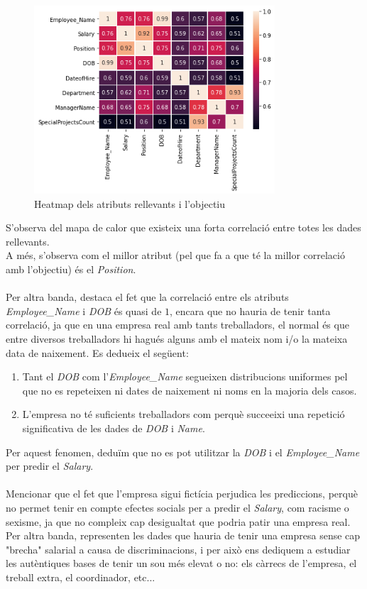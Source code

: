 \documentclass[a4paper, 11pt]{article}
\begin{document}
\begin{figure}
    \centering
    \includegraphics[width=0.8\textwidth]{CORRELACIONS/correlacions.png}
    \caption{Heatmap dels atributs rellevants i l'objectiu}
    \label{fig:my_label}
\end{figure}
\hspace{-1.8 em}
S'observa del mapa de calor que existeix una forta correlació entre totes les dades rellevants.\\
A més, s'observa com el millor atribut (pel que fa a que té la millor correlació amb l'objectiu) és el \textit{Position}.\\\\
Per altra banda, destaca el fet que la correlació entre els atributs \textit{Employee\_Name} i \textit{DOB} és quasi de $1$, encara que no hauria de tenir tanta correlació, ja que en una empresa real amb tants treballadors, el normal és que entre diversos treballadors hi hagués alguns amb el mateix nom i/o la mateixa data de naixement. Es dedueix el següent:
\begin{enumerate}
    \item Tant el \textit{DOB} com l'\textit{Employee\_Name} segueixen distribucions uniformes pel que no es repeteixen ni dates de naixement ni noms en la majoria dels casos.
    \item L'empresa no té suficients treballadors com perquè succeeixi una repetició significativa de les dades de \textit{DOB} i \textit{Name}.
\end{enumerate}
Per aquest fenomen, deduïm que no es pot utilitzar la \textit{DOB} i el \textit{Employee\_Name} per predir el \textit{Salary}.\\\\
Mencionar que el fet que l'empresa sigui fictícia perjudica les prediccions, perquè no permet tenir en compte efectes socials per a predir el \textit{Salary}, com racisme o sexisme, ja que no compleix cap desigualtat que podria patir una empresa real. Per altra banda, representen les dades que hauria de tenir una empresa sense cap "brecha" \hspace{0.05em} salarial a causa de discriminacions, i per això ens dediquem a estudiar les autèntiques bases de tenir un sou més elevat o no: els càrrecs de l'empresa, el treball extra, el coordinador, etc...\\\\
\end{document}
